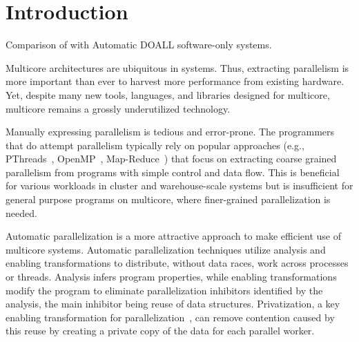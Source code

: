 \section{Introduction}

\begin{table*}[t]
  
  \caption{
    Comparison of \name with Automatic DOALL software-only systems.
  }
  \label{tab:related-work}
    \vspace{-5pt}
\end{table*}

Multicore architectures are ubiquitous in systems.  Thus, extracting
parallelism is more important than ever to harvest more performance
from existing hardware.
%
Yet, despite many new tools, languages, and libraries designed for
multicore, multicore remains a grossly underutilized technology.

%
Manually expressing parallelism is tedious and error-prone. The
programmers that do attempt parallelism typically rely on popular
approaches (e.g., PThreads~\cite{pthread:web},
OpenMP~\cite{openmp:web}, Map-Reduce~\cite{dean:08:cacm}) that focus
on extracting coarse grained parallelism from programs with simple
control and data flow. This is beneficial for various workloads in
cluster and warehouse-scale systems but is insufficient for general
purpose programs on multicore, where finer-grained parallelization is
needed.

%


Automatic parallelization is a more attractive approach to make
efficient use of multicore systems.
%
Automatic parallelization techniques utilize analysis and enabling
transformations to distribute, without data races, work across
processes or threads.
%
Analysis infers program properties, while enabling transformations
modify the program to eliminate parallelization inhibitors identified
by the analysis, the main inhibitor being reuse of data structures.
Privatization, a key enabling transformation for
parallelization~\cite{citations_from_privateer}, can remove contention
caused by this reuse by creating a private copy of the data for each parallel
worker.

